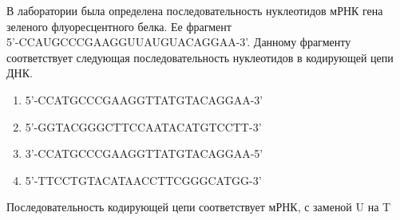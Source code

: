 
В лаборатории была определена последовательность нуклеотидов мРНК гена зеленого флуоресцентного
белка. Ее фрагмент\\ 5'-CCAUGCCCGAAGGUUAUGUACAGGAA-3'. Данному фрагменту соответствует следующая
последовательность нуклеотидов в кодирующей цепи ДНК.

\begin{enumerate}
    \item 5'-CCATGCCCGAAGGTTATGTACAGGAA-3'
    \item 5'-GGTACGGGCTTCCAATACATGTCCTT-3'
    \item 3’-CCATGCCCGAAGGTTATGTACAGGAA-5'
    \item 5’-TTCCTGTACATAACCTTCGGGCATGG-3’
\end{enumerate}

\explanationSection

Последовательность кодирующей цепи соответствует мРНК, с заменой U на T

